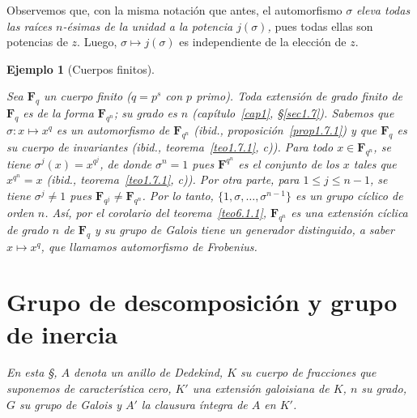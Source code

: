 \documentclass[bibtotoc,leqno,spanish]{amsbook}
\newcommand{\FF}{\mathbf{F}}
\numberwithin{equation}{section}
\theoremstyle{note}
\theoremstyle{note}
\theoremstyle{rem}
\newtheorem{example}{Ejemplo}
\numberwithin{theorem}{section}
\numberwithin{proposition}{section}
\numberwithin{definition}{section}
\numberwithin{lemma}{section}
\numberwithin{corollary}{section}
\numberwithin{example}{section}
\numberwithin{footnote}{section}%
\begin{document}
Observemos que, con la misma notaci\'on que antes, el automorfismo $\sigma$ {\em eleva
todas las ra\'ices
$n$-\'esimas de la unidad a la potencia $j(\sigma)$,} pues todas ellas son potencias
de $z$. Luego, $\sigma\mapsto j(\sigma)$ es independiente de la elecci\'on de $z$.

\begin{example}[Cuerpos finitos]\label{ej6.1.3}


Sea $\FF_{q}$ un cuerpo {\em finito} ($q = p^{s}$ con $p$ primo). Toda extensi\'on de grado finito de $\FF_{q}$
es de la forma $\FF_{q^{n}}$; su grado es $n$ (cap\'itulo~\ref{cap1}, \S\ref{sec1.7}). Sabemos que
$\sigma:x\mapsto x^{q}$ es un automorfismo de $\FF_{q^{n}}$ ({\itshape ibid.}, proposici\'on~\ref{prop1.7.1}) y que
$\FF_{q}$ es su cuerpo de invariantes ({\itshape ibid.}, teorema~\ref{teo1.7.1}, {\itshape c})). Para todo $x\in\FF_{q^{n}}$,
se tiene $\sigma^{j}(x) = x^{q^{j}}$, de donde $\sigma^{n}=1$ pues $\FF^{q^{n}}$ es el conjunto de los
$x$ tales que $x^{q^{n}}=x$ ({\itshape ibid.},
teorema~\ref{teo1.7.1}, {\itshape c})). Por otra parte, para
$1\leq j\leq n-1$, se tiene $\sigma^{j}\neq 1$ pues $\FF_{q^{j}}\neq\FF_{q^{n}}$. Por lo tanto,
$\{1,\sigma,\dots,\sigma^{n-1}\}$ es un grupo c\'iclico de orden $n$. As\'i, por el corolario
del teorema~\ref{teo6.1.1}, $\FF_{q^{n}}$
{\em es una extensi\'on c\'iclica de grado $n$ de $\FF_{q}$ y su grupo de Galois tiene un generador
distinguido, a saber $x\mapsto x^{q}$, que llamamos automorfismo de Frobenius.}
\end{example}

\section{Grupo de descomposici\'on y grupo de inercia}\label{sec6.2}

\begin{trivlist}
\item \textit{En esta \S, $A$ denota un anillo de Dedekind, $K$ su cuerpo de fracciones que suponemos
de caracter\'istica cero, $K'$ una extensi\'on galoisiana de $K$, $n$ su grado, $G$ su grupo de Galois y
$A'$ la clausura \'integra de $A$ en $K'$.}
\end{trivlist}
\end{document}
